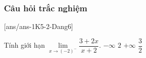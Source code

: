
\subsubsection{Câu hỏi trắc nghiệm}
[ans/ans-1K5-2-Dang6]
\begin{ex}%
	Tính giới hạn $\lim\limits_{x \to(-2)^{-}} \dfrac{3+2 x}{x+2}$.
	\choice
	{$-\infty$}
	{$2$}
	{\True $+\infty$}
	{$\dfrac{3}{2}$}
\end{ex}

